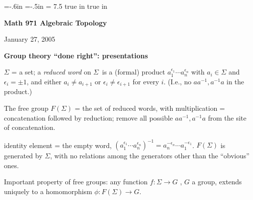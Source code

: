 

\overfullrule=0pt
\parindent=0pt

\nopagenumbers



\voffset=-.6in
\hoffset=-.5in
\hsize = 7.5 true in
 true in




\loadmsbm



\def\ctln{\centerline}
\def\u{\underbar}
\def\ssk{\smallskip}
\def\msk{\medskip}
\def\bsk{\bigskip}
\def\hsk{\hskip.1in}
\def\hhsk{\hskip.2in}
\def\dsl{\displaystyle}
\def\hskp{\hskip1.5in}

\def\lra{$\Leftrightarrow$ }
\def\ra{\rightarrow}
\def\mpto{\logmapsto}
\def\pu{\pi_1}
\def\mpu{$\pi_1$}
\def\sig{\Sigma}
\def\msig{$\Sigma$}
\def\ep{\epsilon}
\def\sset{\subseteq}




\ctln{\bf Math 971 Algebraic Topology}

\ssk

\ctln{January 27, 2005}

\msk

{\bf Group theory ``done right'': presentations}

\msk

$\Sigma$ = a set; a {\it reduced word} on \msig\ is a (formal)
product $a_1^{\ep_1}\cdots a_n^{\ep_n}$ with $a_i\in\sig$ and $\ep_i=\pm 1$,
and either $a_i\neq a_{i+1}$ or $\ep_i\neq \ep_{i+1}$ for every $i$. (I.e., no
$aa^{-1},a^{-1}a$ in the product.)

\ssk

The free group $F(\sig)$ = the set of reduced words, with multiplication = concatenation 
followed by reduction; remove all possible $aa^{-1},a^{-1}a$ from the site of concatenation.

\ssk

identity element = the empty word, 
$(a_1^{\ep_1}\cdots a_n^{\ep_n})^{-1} = a_n^{-\ep_n}\cdots a_1^{-\ep_1}$. 
$F(\sig)$ is generated by \msig, with no relations among the generators
other than the ``obvious'' ones.

\msk

Important property of free groups: any function $f:\sig\ra G$ , $G$ a group, extends
uniquely to a homomorphism $\phi: F(\sig)\ra G$.

\msk

